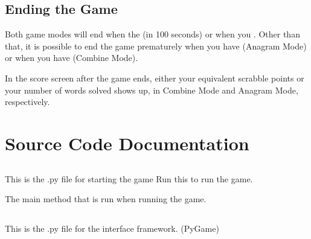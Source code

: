 \documentclass[letterpaper,10pt,english,openany,oneside]{sphinxmanual}
\begin{document}
\section{Ending the Game}
\label{\detokenize{index:ending-the-game}}
Both game modes will end when the 
(in 100 seconds) or when you . Other than that,
it is possible to end the game prematurely when you have  (Anagram Mode)
or when you have  (Combine Mode).

In the score screen after the game ends, either your equivalent scrabble points or your number
of words solved shows up, in Combine Mode and Anagram Mode, respectively.




\chapter{Source Code Documentation}
\label{\detokenize{index:source-code-documentation}}

\section{}
\label{\detokenize{index:module-main}}\label{\detokenize{index:main-py}}
This is the .py file for starting the game
Run this to run the game.

\begin{fulllineitems}
\label{\detokenize{index:main.main}}
The main method that is run when running the game.

\end{fulllineitems}



\section{}
\label{\detokenize{index:module-interface}}\label{\detokenize{index:interface-py}}
This is the .py file for the interface
framework. (PyGame)
\end{document}
